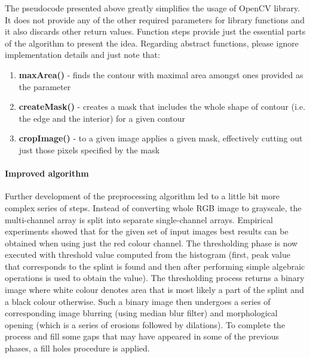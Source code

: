 The pseudocode presented above greatly simplifies the usage of OpenCV library. It does not provide any of the other required parameters for library functions and it also discards other return values. Function steps provide just the essential parts of the algorithm to present the idea. Regarding abstract functions, please ignore implementation details and just note that:
\begin{enumerate}
	\item \textbf{maxArea()} - finds the contour with maximal area amongst ones provided as the parameter
	\item \textbf{createMask()} - creates a mask that includes the whole shape of contour (i.e. the edge and the interior) for a given contour
	\item \textbf{cropImage()} - to a given image applies a given mask, effectively cutting out just those pixels specified by the mask 
\end{enumerate}

\paragraph{Improved algorithm}
Further development of the preprocessing algorithm led to a little bit more complex series of steps. Instead of converting whole RGB image to grayscale, the multi-channel array is split into separate single-channel arrays. Empirical experiments showed that for the given set of input images best results can be obtained when using just the red colour channel. The thresholding phase is now executed with threshold value computed from the histogram (first, peak value that corresponds to the splint is found and then after performing simple algebraic operations is used to obtain the value). The thresholding process returns a binary image where white colour denotes area that is most likely a part of the splint and a black colour otherwise. Such a binary image then undergoes a series of corresponding image blurring (using median blur filter) and morphological opening (which is a series of erosions followed by dilations). To complete the process and fill some gaps that may have appeared in some of the previous phases, a fill holes procedure is applied.

